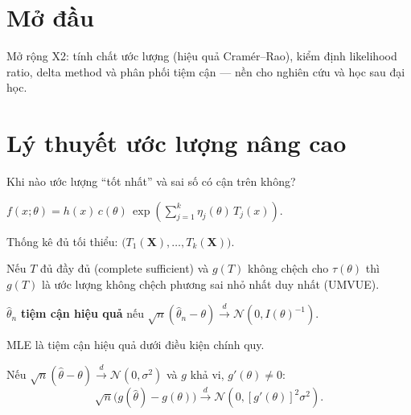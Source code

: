 \documentclass[12pt,a4paper]{article}
\begin{document}

\newpage
\tableofcontents
\newpage



\section{Mở đầu}

\begin{dongco}[title={Động cơ --- Mở đầu}]
Mở rộng X2: tính chất ước lượng (hiệu quả Cramér--Rao), kiểm định likelihood ratio, delta method và phân phối tiệm cận --- nền cho nghiên cứu và học sau đại học.
\end{dongco}

\newpage

\section{Lý thuyết ước lượng nâng cao}

\begin{dongco}[title={Động cơ --- Lý thuyết ước lượng nâng cao}]
Khi nào ước lượng ``tốt nhất'' và sai số có cận trên không?
\end{dongco}

\begin{dinhnghia}[title={Họ mũ (exponential family)}]
  $f(x;\theta) = h(x)\,c(\theta)\,\exp\!\left(\sum_{j=1}^k \eta_j(\theta)\,T_j(x)\right)$.

  Thống kê đủ tối thiểu: $\bigl(T_1(\mathbf{X}), \ldots, T_k(\mathbf{X})\bigr)$.
\end{dinhnghia}

\begin{dinhly}[title={Lehmann--Scheffé}]
  Nếu $T$ đủ đầy đủ (complete sufficient) và $g(T)$ không chệch cho $\tau(\theta)$ thì $g(T)$ là ước lượng không chệch phương sai nhỏ nhất duy nhất (UMVUE).
\end{dinhly}

\begin{dinhnghia}[title={Tính hiệu quả tiệm cận}]
  $\hat{\theta}_n$ \textbf{tiệm cận hiệu quả} nếu $\sqrt{n}(\hat{\theta}_n - \theta) \xrightarrow{d} \mathcal{N}(0, I(\theta)^{-1})$.

  MLE là tiệm cận hiệu quả dưới điều kiện chính quy.
\end{dinhnghia}

\begin{phuongphap}[title={Phương pháp delta}]
  Nếu $\sqrt{n}(\hat{\theta} - \theta) \xrightarrow{d} \mathcal{N}(0, \sigma^2)$ và $g$ khả vi, $g'(\theta) \ne 0$:
  \[
    \sqrt{n}\bigl(g(\hat{\theta}) - g(\theta)\bigr) \xrightarrow{d} \mathcal{N}\!\left(0, [g'(\theta)]^2\sigma^2\right).
  \]
\end{phuongphap}
\end{document}

